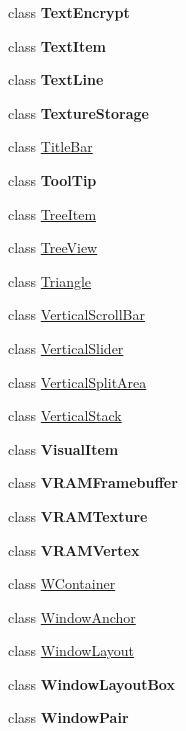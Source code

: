\begin{DoxyCompactItemize}
\item 
class {\bfseries Text\+Encrypt}
\item 
class {\bfseries Text\+Item}
\item 
class {\bfseries Text\+Line}
\item 
class {\bfseries Texture\+Storage}
\item 
class \mbox{\hyperlink{class_space_v_i_l_1_1_title_bar}{Title\+Bar}}
\item 
class {\bfseries Tool\+Tip}
\item 
class \mbox{\hyperlink{class_space_v_i_l_1_1_tree_item}{Tree\+Item}}
\item 
class \mbox{\hyperlink{class_space_v_i_l_1_1_tree_view}{Tree\+View}}
\item 
class \mbox{\hyperlink{class_space_v_i_l_1_1_triangle}{Triangle}}
\item 
class \mbox{\hyperlink{class_space_v_i_l_1_1_vertical_scroll_bar}{Vertical\+Scroll\+Bar}}
\item 
class \mbox{\hyperlink{class_space_v_i_l_1_1_vertical_slider}{Vertical\+Slider}}
\item 
class \mbox{\hyperlink{class_space_v_i_l_1_1_vertical_split_area}{Vertical\+Split\+Area}}
\item 
class \mbox{\hyperlink{class_space_v_i_l_1_1_vertical_stack}{Vertical\+Stack}}
\item 
class {\bfseries Visual\+Item}
\item 
class {\bfseries V\+R\+A\+M\+Framebuffer}
\item 
class {\bfseries V\+R\+A\+M\+Texture}
\item 
class {\bfseries V\+R\+A\+M\+Vertex}
\item 
class \mbox{\hyperlink{class_space_v_i_l_1_1_w_container}{W\+Container}}
\item 
class \mbox{\hyperlink{class_space_v_i_l_1_1_window_anchor}{Window\+Anchor}}
\item 
class \mbox{\hyperlink{class_space_v_i_l_1_1_window_layout}{Window\+Layout}}
\item 
class {\bfseries Window\+Layout\+Box}
\item 
class {\bfseries Window\+Pair}
\end{DoxyCompactItemize}
